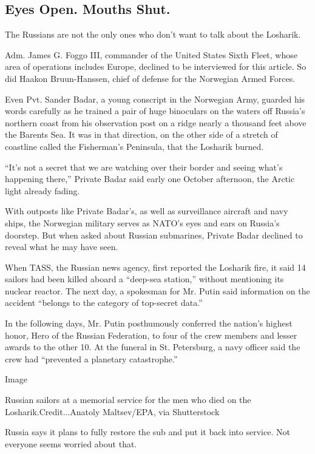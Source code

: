 \hypertarget{eyes-open-mouths-shut}{%
\subsection{Eyes Open. Mouths Shut.}\label{eyes-open-mouths-shut}}

The Russians are not the only ones who don't want to talk about the
Losharik.

Adm. James G. Foggo III, commander of the United States Sixth Fleet,
whose area of operations includes Europe, declined to be interviewed for
this article. So did Haakon Bruun-Hanssen, chief of defense for the
Norwegian Armed Forces.

Even Pvt. Sander Badar, a young conscript in the Norwegian Army, guarded
his words carefully as he trained a pair of huge binoculars on the
waters off Russia's northern coast from his observation post on a ridge
nearly a thousand feet above the Barents Sea. It was in that direction,
on the other side of a stretch of coastline called the Fisherman's
Peninsula, that the Losharik burned.

``It's not a secret that we are watching over their border and seeing
what's happening there,'' Private Badar said early one October
afternoon, the Arctic light already fading.

With outposts like Private Badar's, as well as surveillance aircraft and
navy ships, the Norwegian military serves as NATO's eyes and ears on
Russia's doorstep. But when asked about Russian submarines, Private
Badar declined to reveal what he may have seen.

When TASS, the Russian news agency, first reported the Losharik fire, it
said 14 sailors had been killed aboard a ``deep-sea station,'' without
mentioning its nuclear reactor. The next day, a spokesman for Mr. Putin
said information on the accident ``belongs to the category of top-secret
data.''

In the following days, Mr. Putin posthumously conferred the nation's
highest honor, Hero of the Russian Federation, to four of the crew
members and lesser awards to the other 10. At the funeral in St.
Petersburg, a navy officer said the crew had ``prevented a planetary
catastrophe.''

Image

Russian sailors at a memorial service for the men who died on the
Losharik.Credit...Anatoly Maltsev/EPA, via Shutterstock

Russia says it plans to fully restore the sub and put it back into
service. Not everyone seems worried about that.

